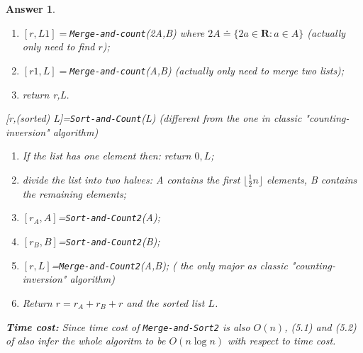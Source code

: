 \documentclass[11pt]{article}
\theoremstyle{numberplain}
\theoremstyle{nonumberplain}
\newtheorem{ans}{Answer}
\def\half{{\frac12}}
\newcommand{\flr}[1]{{\lfloor {#1} \rfloor}}
\newcommand{\0}{{\mathbf{0}}}
\begin{document}
\begin{ans}
\begin{code}
\begin{enumerate}
\item $[r,L1]=${\tt Merge-and-count}(2A,B) where $2A\doteq \{2a\in \mathbf{R}:a\in A\}$ (actually only need to find $r$);
\item $[r1,L]=${\tt Merge-and-count}(A,B) (actually only need to merge two lists);
\item return r,L.
\end{enumerate}
\end{code}
[r,(sorted) L]={\tt Sort-and-Count}(L) (different from the one in classic "counting-inversion" algorithm)
\begin{code}
\begin{enumerate}
\item If the list has one element then: return $0,L$;
\item divide the list into two halves: A contains the first $\flr{\half n}$ elements, B contains the remaining elements;
\item $[r_A,A]$={\tt Sort-and-Count2}(A);
\item $[r_B,B]$={\tt Sort-and-Count2}(B);
\item $[r,L]$={\tt Merge-and-Count2}(A,B); ( the only major as classic "counting-inversion" algorithm)
\item Return $r=r_A+r_B+r$ and the sorted list $L$.
\end{enumerate}
\end{code}
\textbf{Time cost:} Since time cost of {\tt Merge-and-Sort2} is also $O(n)$, (5.1) and (5.2) of \cite{jon2005algorithm} also infer the whole algoritm to be $O(n\log n)$ with respect to time cost.
\end{ans}
\end{document}
